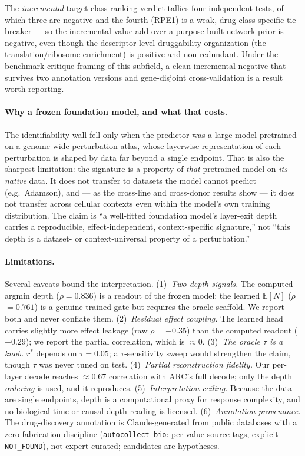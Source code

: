 \documentclass[11pt]{article}
\newcommand{\EN}{\ensuremath{\mathbb{E}[N]}}
\newcommand{\rstar}{\ensuremath{r^{\!*}}}
\let\mathrho\rho
\renewcommand{\rho}{\ensuremath{\mathrho}}
\begin{document}
The \emph{incremental} target-class ranking verdict tallies four independent tests, of which three
are negative and the fourth (RPE1) is a weak, drug-class-specific tie-breaker --- so the incremental
value-add over a purpose-built network prior is negative, even though the descriptor-level
druggability organization (the translation/ribosome enrichment) is positive and non-redundant. Under
the benchmark-critique framing of this subfield, a clean incremental negative that survives two
annotation versions and gene-disjoint cross-validation is a result worth reporting.

\paragraph{Why a frozen foundation model, and what that costs.} The identifiability wall fell only
when the predictor was a large model pretrained on a genome-wide perturbation atlas, whose
layerwise representation of each perturbation is shaped by data far beyond a single endpoint. That
is also the sharpest limitation: the signature is a property of \emph{that} pretrained model on
\emph{its native} data. It does not transfer to datasets the model cannot predict (e.g.\ Adamson),
and --- as the cross-line and cross-donor results show --- it does not transfer across cellular
contexts even within the model's own training distribution. The claim is ``a well-fitted
foundation model's layer-exit depth carries a reproducible, effect-independent, context-specific
signature,'' not ``this depth is a dataset- or context-universal property of a perturbation.''

\paragraph{Limitations.} Several caveats bound the interpretation.
(1)~\emph{Two depth signals.} The computed argmin depth (\rho{}$=0.836$) is a readout of the
frozen model; the learned \EN{} (\rho{}$=0.761$) is a genuine trained gate but requires the oracle
scaffold. We report both and never conflate them.
(2)~\emph{Residual effect coupling.} The learned head carries slightly more effect leakage (raw
\rho{}$=-0.35$) than the computed readout ($-0.29$); we report the partial correlation, which is
$\approx0$.
(3)~\emph{The oracle $\tau$ is a knob.} \rstar{} depends on $\tau=0.05$; a $\tau$-sensitivity sweep
would strengthen the claim, though $\tau$ was never tuned on test.
(4)~\emph{Partial reconstruction fidelity.} Our per-layer decode reaches $\approx0.67$ correlation
with ARC's full decode; only the depth \emph{ordering} is used, and it reproduces.
(5)~\emph{Interpretation ceiling.} Because the data are single endpoints, depth is a computational
proxy for response complexity, and no biological-time or causal-depth reading is licensed.
(6)~\emph{Annotation provenance.} The drug-discovery annotation is Claude-generated from public
databases with a zero-fabrication discipline (\texttt{autocollect-bio}: per-value source tags,
explicit \texttt{NOT\_FOUND}), not expert-curated; candidates are hypotheses.
\end{document}
